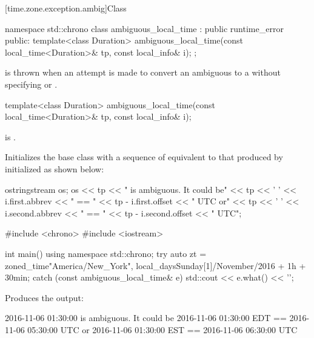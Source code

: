 [time.zone.exception.ambig]{Class }

\begin{codeblock}
namespace std::chrono {
  class ambiguous_local_time : public runtime_error {
  public:
    template<class Duration>
      ambiguous_local_time(const local_time<Duration>& tp, const local_info& i);
  };
}
\end{codeblock}

\pnum
{} is thrown when
an attempt is made
to convert an ambiguous  to a 
without specifying  or .

%
\begin{itemdecl}
template<class Duration>
  ambiguous_local_time(const local_time<Duration>& tp, const local_info& i);
\end{itemdecl}

\begin{itemdescr}
\pnum
\expects
{} is .

\pnum
\effects
Initializes the base class with a sequence of 
equivalent to that produced by 
initialized as shown below:
\begin{codeblock}
ostringstream os;
os << tp << " is ambiguous.  It could be\n"
   << tp << ' ' << i.first.abbrev << " == "
   << tp - i.first.offset << " UTC or\n"
   << tp << ' ' << i.second.abbrev  << " == "
   << tp - i.second.offset  << " UTC";
\end{codeblock}

\pnum
\begin{example}
\begin{codeblock}
#include <chrono>
#include <iostream>

int main() {
  using namespace std::chrono;
  try {
    auto zt = zoned_time{"America/New_York",
                         local_days{Sunday[1]/November/2016} + 1h + 30min};
  } catch (const ambiguous_local_time& e) {
    std::cout << e.what() << '\n';
  }
}
\end{codeblock}

Produces the output:
\begin{outputblock}
2016-11-06 01:30:00 is ambiguous.  It could be
2016-11-06 01:30:00 EDT == 2016-11-06 05:30:00 UTC or
2016-11-06 01:30:00 EST == 2016-11-06 06:30:00 UTC
\end{outputblock}
\end{example}
\end{itemdescr}

